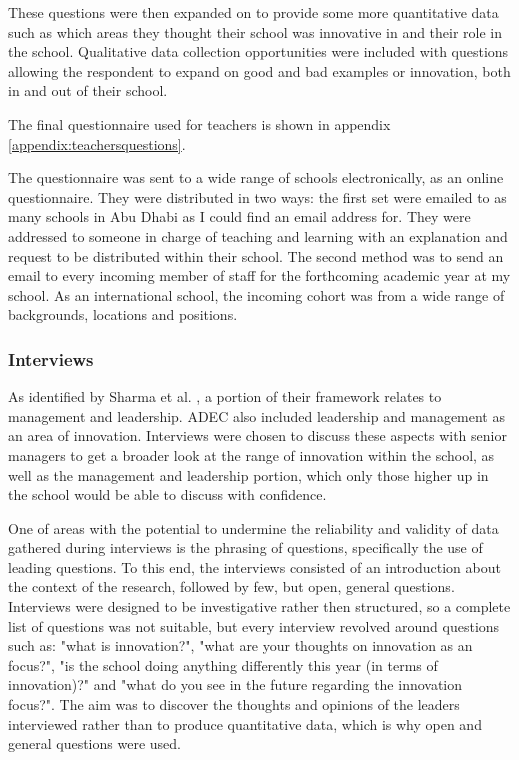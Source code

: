 These questions were then expanded on to provide some more quantitative data such as which areas they thought their school was innovative in and their role in the school. Qualitative data collection opportunities were included with questions allowing the respondent to expand on good and bad examples or innovation, both in and out of their school.

The final questionnaire used for teachers is shown in appendix \ref{appendix:teachersquestions}.

The questionnaire was sent to a wide range of schools electronically, as an online questionnaire. They were distributed in two ways: the first set were emailed to as many schools in Abu Dhabi as I could find an email address for. They were addressed to someone in charge of teaching and learning with an explanation and request to be distributed within their school. The second method was to send an email to every incoming member of staff for the forthcoming academic year at my school. As an international school, the incoming cohort was from a wide range of backgrounds, locations and positions.


\subsubsection{Interviews}

As identified by Sharma et al. \citep{Sharma2005}, a portion of their framework relates to management and leadership. ADEC also included leadership and management as an area of innovation. Interviews were chosen to discuss these aspects with senior managers to get a broader look at the range of innovation within the school, as well as the management and leadership portion, which only those higher up in the school would be able to discuss with confidence.

One of areas with the potential to undermine the reliability and validity of data gathered during interviews is the phrasing of questions, specifically the use of leading questions. To this end, the interviews consisted of an introduction about the context of the research, followed by few, but open, general questions. Interviews were designed to be investigative rather then structured, so a complete list of questions was not suitable, but every interview revolved around questions such as: "what is innovation?", "what are your thoughts on innovation as an focus?", "is the school doing anything differently this year (in terms of innovation)?" and "what do you see in the future regarding the innovation focus?". The aim was to discover the thoughts and opinions of the leaders interviewed rather than to produce quantitative data, which is why open and general questions were used.

